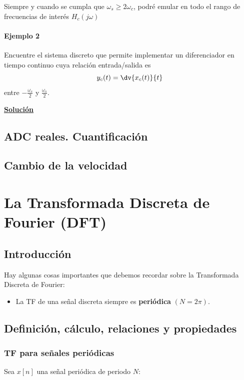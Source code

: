 \documentclass[a4paper]{book}
\begin{document}
Siempre y cuando se cumpla que $\omega_s\geq 2\omega_c$, podré emular en todo el rango de frecuencias de interés $H_c \left( j\omega \right)$

\subsubsection{Ejemplo 2}

Encuentre el sistema discreto que permite implementar un diferenciador en tiempo continuo cuya relación entrada/salida es
\[ y_c(t) = \dv{x_c(t)}{t} \]
entre $-\frac{\omega_s}{2}$ y $\frac{\omega_s}{2}$.

\textbf{\underline{Solución}}


\section{ADC reales. Cuantificación}

\section{Cambio de la velocidad}

\chapter{La Transformada Discreta de Fourier (DFT)}

\section{Introducción}

Hay algunas cosas importantes que debemos recordar sobre la Transformada Discreta de Fourier:

\begin{itemize}
	\item La TF de una señal discreta siempre es \textbf{periódica} $\left( N = 2\pi \right)$.
\end{itemize}

\section{Definición, cálculo, relaciones y propiedades}

\subsection{TF para señales periódicas}

Sea $x[n]$ una señal periódica de periodo $N$:
\end{document}

